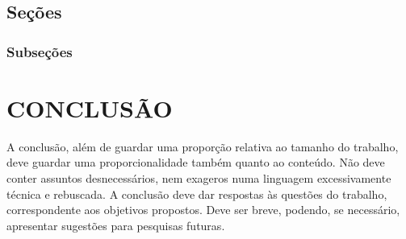 \documentclass[a4paper,12pt]{article}
\begin{document}
\subsection{Seções}

\subsubsection{Subseções}

\newpage


\thispagestyle{main}

\section{CONCLUSÃO}


\hspace{4ex}A conclusão, além de guardar uma proporção relativa ao tamanho do trabalho,
deve guardar uma proporcionalidade também quanto ao conteúdo. Não deve conter
assuntos desnecessários, nem exageros numa linguagem excessivamente técnica e
rebuscada. A conclusão deve dar respostas às questões do trabalho, correspondente aos
objetivos propostos. Deve ser breve, podendo, se necessário, apresentar sugestões para
pesquisas futuras.

\newpage




\appendix


\end{document}

